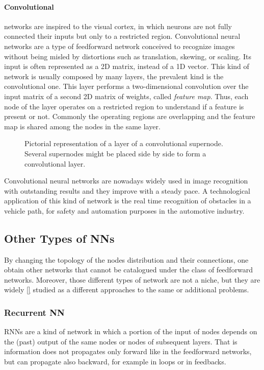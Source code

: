 \paragraph{Convolutional}\label{par:Convolutional} networks are inspired to the visual cortex, in which neurons are not fully connected their inputs but only to a restricted region.
Convolutional neural networks are a type of feedforward network conceived to recognize images without being misled by distortions such as translation, skewing, or scaling.
Its input is often represented as a 2D matrix, instead of a 1D vector.
This kind of network is usually composed by many layers, the prevalent kind is the convolutional one.
This layer performs a two-dimensional convolution over the input matrix of a second 2D matrix of weights, called \textit{feature map}.
Thus, each node of the layer operates on a restricted region to understand if a feature is present or not.
Commonly the operating regions are overlapping and the feature map is shared among the nodes in the same layer.

\begin{figure}[ht]
	\centering
	
	\caption{%
		Pictorial representation of a layer of a convolutional supernode.
		Several supernodes might be placed side by side to form a convolutional layer.
		}
	\label{fig:convolutionalNN}
\end{figure}

Convolutional neural networks are nowadays widely used in image recognition with outstanding results and they improve with a steady pace.
A technological application of this kind of network is the real time recognition of obstacles in a vehicle path, for safety and automation purposes in the automotive industry.

\subsection{Other Types of NNs}
\label{ssec:Other_Types_of_NNs}
By changing the topology of the nodes distribution and their connections, one obtain other networks that cannot be catalogued under the class of feedforward networks.
Moreover, those different types of network are not a niche, but they are widely \ref{} studied as a different approaches to the same or additional problems.

\subsubsection{Recurrent NN}
\label{sssec:Recurrent_NN}
\acp{RNN} are a kind of network in which a portion of the input of nodes depends on the (past) output of the same nodes or nodes of subsequent layers.
That is information does not propagates only forward like in the feedforward networks, but can propagate also backward, for example in loops or in feedbacks.

